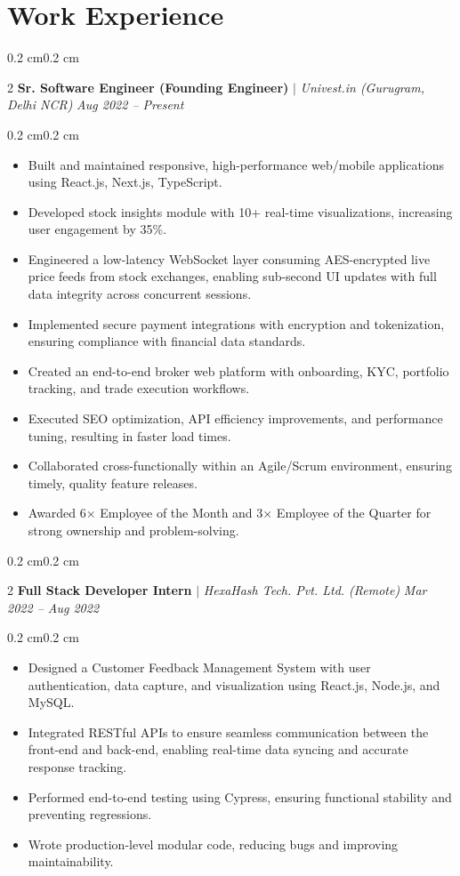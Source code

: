 \documentclass[10pt, letterpaper]{article}
\newenvironment{highlights}{\begin{itemize}[topsep=0 cm,parsep=0 cm,partopsep=0pt,itemsep=0pt,leftmargin=0.4 cm + 10pt]}{\end{itemize}}
\newenvironment{onecolentry}{\begin{adjustwidth}{0.2 cm}{0.2 cm}\linespread{1.2}\selectfont}{\end{adjustwidth}}
\newenvironment{twocolentry}[2][]{\onecolentry\def\secondColumn{#2}\setcolumnwidth{\fill, 4.5 cm}\begin{paracol}{2}}{\switchcolumn \raggedleft \secondColumn\end{paracol}\endonecolentry}
\newcommand{\aftersectionspace}{\vspace{4pt}}
\begin{document}
\section{Work Experience}
\begin{twocolentry}{\textit{Aug 2022 – Present}}
\textbf{Sr. Software Engineer (Founding Engineer)} $|$ \textit{Univest.in (Gurugram, Delhi NCR)}
\end{twocolentry}
\begin{onecolentry}
\begin{highlights}
\item Built and maintained responsive, high-performance web/mobile applications using React.js, Next.js, TypeScript.
\item Developed stock insights module with 10+ real-time visualizations, increasing user engagement by 35\%.
\item Engineered a low-latency WebSocket layer consuming AES-encrypted live price feeds from stock exchanges, enabling sub-second UI updates with full data integrity across concurrent sessions.
\item Implemented secure payment integrations with encryption and tokenization, ensuring compliance with financial data standards.
\item Created an end-to-end broker web platform with onboarding, KYC, portfolio tracking, and trade execution workflows.
\item Executed SEO optimization, API efficiency improvements, and performance tuning, resulting in faster load times.
\item Collaborated cross-functionally within an Agile/Scrum environment, ensuring timely, quality feature releases.
\item Awarded 6× Employee of the Month and 3× Employee of the Quarter for strong ownership and problem-solving.
\end{highlights}
\end{onecolentry}
\aftersectionspace
\begin{twocolentry}{\textit{Mar 2022 – Aug 2022}}
\textbf{Full Stack Developer Intern} $|$ \textit{HexaHash Tech. Pvt. Ltd. (Remote)}
\end{twocolentry}
\begin{onecolentry}
\begin{highlights}
\item Designed a Customer Feedback Management System with user authentication, data capture, and visualization using React.js, Node.js, and MySQL.
\item Integrated RESTful APIs to ensure seamless communication between the front-end and back-end, enabling real-time data syncing and accurate response tracking.
\item Performed end-to-end testing using Cypress, ensuring functional stability and preventing regressions.
\item Wrote production-level modular code, reducing bugs and improving maintainability.
\end{highlights}
\end{onecolentry}
\end{document}
